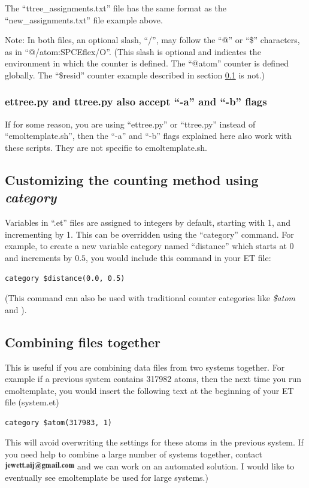 \documentclass[11pt]{article}
\begin{document}
The ``ttree\_assignments.txt'' file has the same format 
as the ``new\_assignments.txt'' file example above.

Note: In both files, an optional slash, ``/'', 
      may follow the ``@'' or ``\$'' characters, 
      as in ``@/atom:SPCEflex/O''. 
(This slash is optional and indicates
the environment in which the counter is defined.
The ``@atom'' counter is defined globally.
The ``\$resid'' counter example described 
in section \ref{sec:custom_categories} is not.)
       



\subsubsection*{ettree.py and ttree.py also accept ``-a'' and ``-b'' flags}
If for some reason, you are using ``ettree.py'' or ``ttree.py'' 
instead of ``emoltemplate.sh'', then the ``-a'' and ``-b'' flags explained 
here also work with these scripts.  They are not specific to emoltemplate.sh.




\subsection{Customizing the counting method using \textit{category}}
\label{sec:custom_categories}
Variables in ``.et'' files are assigned to integers by default,
starting with 1, and incrementing by 1.
This can be overridden using the ``category'' command.
For example, to create a new variable category named ``distance''
which starts at $0$ and increments by $0.5$, 
you would include this command in your ET file:
\begin{verbatim}
category $distance(0.0, 0.5)
\end{verbatim}
(This command can also be used with traditional counter categories like
\textit{\$atom} and \textit{\@bond}).

\subsection{Combining files together}
\label{sec:combining_data_files}
This is useful if you are combining data files from two systems together. 
For example if a previous system contains 
317982 atoms, then the next time you run emoltemplate, 
you would insert the following text 
at the beginning of your ET file (system.et)
\begin{verbatim}
category $atom(317983, 1)
\end{verbatim}
This will avoid overwriting the settings for these 
atoms in the previous system.
If you need help to combine a large number of systems together, 
contact \includegraphics[height=0.3cm]{author_email.png} 
and we can work on an automated solution.
I would like to eventually see emoltemplate be used for large systems.)
\end{document}

